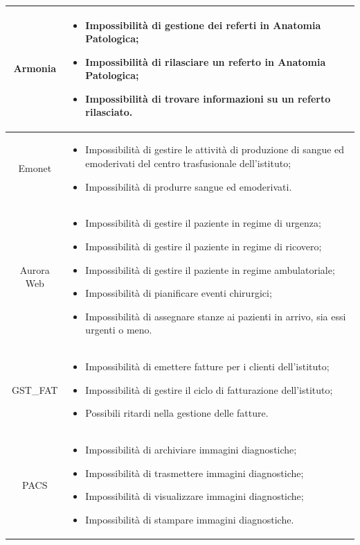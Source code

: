 \documentclass[12pt, a4paper, titlepage]{report}
\begin{document}
\begin{longtable}{| c | p{10cm} |}
				Armonia & \begin{itemize} \item Impossibilità di gestione dei referti in Anatomia Patologica; \item Impossibilità di rilasciare un referto in Anatomia Patologica; \item Impossibilità di trovare informazioni su un referto rilasciato.	\end{itemize}\\ \hline
				Emonet & \begin{itemize}\item Impossibilità di gestire le attività di produzione di sangue ed emoderivati del centro trasfusionale dell'istituto; \item Impossibilità di produrre sangue ed emoderivati. \end{itemize}\\ \hline
				Aurora Web & \begin{itemize} \item Impossibilità di gestire il paziente in regime di urgenza; \item Impossibilità di gestire il paziente in regime di ricovero; \item Impossibilità di gestire il paziente in regime ambulatoriale; \item Impossibilità di pianificare eventi chirurgici; \item Impossibilità di assegnare stanze ai pazienti in arrivo, sia essi urgenti o meno. \end{itemize}\\ \hline
				GST\_FAT & \begin{itemize}\item Impossibilità di emettere fatture per i clienti dell'istituto; \item Impossibilità di gestire il ciclo di fatturazione dell'istituto; \item Possibili ritardi nella gestione delle fatture. \end{itemize}\\ \hline
				PACS & \begin{itemize}\item Impossibilità di archiviare immagini diagnostiche; \item Impossibilità di trasmettere immagini diagnostiche; \item Impossibilità di visualizzare immagini diagnostiche; \item Impossibilità di stampare immagini diagnostiche.		\end{itemize}\\ \hline

\end{longtable}
\end{document}

